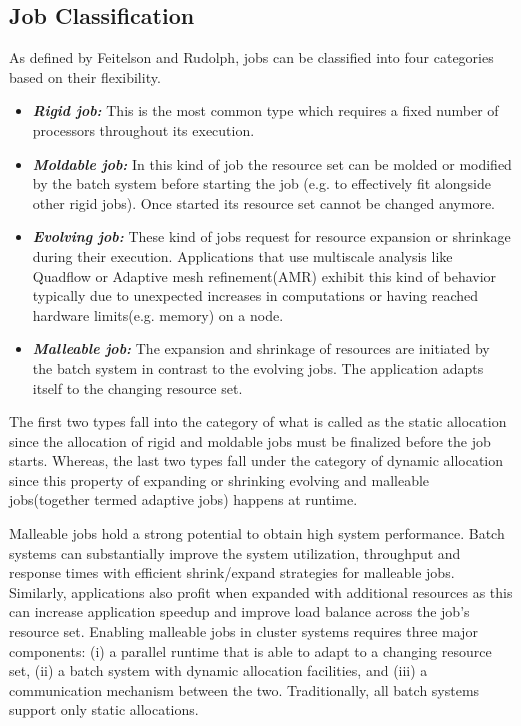 \documentclass{acm_proc_article-sp}
\begin{document}
\subsection{Job Classification}
As defined by Feitelson and Rudolph\cite{rudolph}, jobs can be classified into four categories based on their flexibility.
\begin{itemize}
\item \textbf{\textit{Rigid job:}} This is the most common type which requires a fixed number of processors throughout its execution.
\item \textbf{\textit{Moldable job:}} In this kind of job the resource set can be molded or modified by the batch system before starting the job (e.g. to effectively fit alongside other rigid jobs). Once started its resource set cannot be changed anymore.
\item \textbf{\textit{Evolving job:}} These kind of jobs request for resource expansion or shrinkage during their execution. Applications that use multiscale analysis like Quadflow or Adaptive mesh refinement(AMR) exhibit this kind of behavior typically due to unexpected increases in computations or having reached hardware limits(e.g. memory) on a node.
\item \textbf{\textit{Malleable job:}} The expansion and shrinkage of resources are initiated by the batch system in contrast to the evolving jobs. The application adapts itself to the changing resource set.
\end{itemize}
The first two types fall into the category of what is called as the static allocation since the allocation of rigid and moldable jobs must be finalized before the job starts. Whereas, the last two types fall under the category of dynamic allocation since this property of expanding or shrinking evolving and malleable jobs(together termed adaptive jobs) happens at runtime.\par
\noindent
Malleable jobs hold a strong potential to obtain high system performance. Batch systems can substantially improve the system utilization, throughput and response times with efficient shrink/expand strategies for malleable jobs. Similarly, applications also profit when expanded with additional resources as this can increase application speedup and improve load balance across the job{’}s resource set. Enabling malleable jobs in cluster systems requires three major components: (i) a parallel runtime that is able to adapt to a changing resource set, (ii) a batch system with dynamic allocation facilities, and (iii) a communication mechanism between the two. Traditionally, all batch systems support only static allocations.\par
\end{document}
